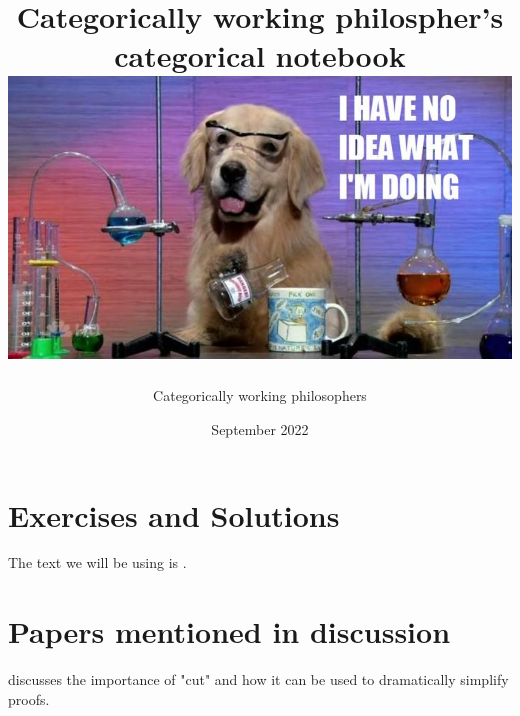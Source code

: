 \documentclass[12pt]{article}
\title{{Categorically working philospher's categorical notebook}\\
{\includegraphics[width=\textwidth]{dog.jpg}}}
\author{Categorically working philosophers}
\date{September 2022}
\begin{document}
\maketitle

\section{Exercises and Solutions}

The text we will be using is \autocite{simmons2011introduction}.

\section{Papers mentioned in discussion}

\cite{Boolos1984-BOODEC} discusses the importance of "cut" and how it can be used to dramatically simplify proofs.

\printbibliography
\end{document}
